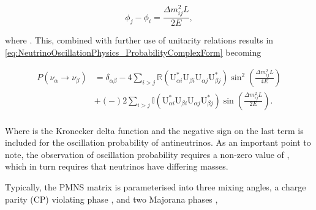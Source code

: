 \begin{equation}
  \phi_{j}-\phi_{i} = \frac{\Delta m^{2}_{ij} L}{2E},
\end{equation}

where . This, combined with further use of unitarity relations results in \autoref{eq:NeutrinoOscillationPhysics_ProbabilityComplexForm} becoming

\begin{equation}
  \label{eq:NeutrinoOscillationPhysics_ProbabilityComplexForm2}
  \begin{split}
    P(\nu_{\alpha} \rightarrow \nu_{\beta}) &= \delta_{\alpha \beta} - 4 \sum_{i>j} \mathbb{R} \left( \mathrm{U}^{*}_{\alpha i}\mathrm{U}_{\beta i}\mathrm{U}_{\alpha j}\mathrm{U}^{*}_{\beta j} \right) \sin^{2} \left( \frac{\Delta m^{2}_{ij} L}{4E} \right) \\
    & + \left( - \right) 2 \sum_{i>j} \mathbb{I} \left( \mathrm{U}^{*}_{\alpha i}\mathrm{U}_{\beta i}\mathrm{U}_{\alpha j}\mathrm{U}^{*}_{\beta j} \right) \sin \left( \frac{\Delta m^{2}_{ij} L}{2E} \right). \\
    \end{split}
\end{equation}

Where \quickmath{\delta_{\alpha \beta}} is the Kronecker delta function and the negative sign on the last term is included for the oscillation probability of antineutrinos. As an important point to note, the observation of oscillation probability requires a non-zero value of , which in turn requires that neutrinos have differing masses.

Typically, the PMNS matrix is parameterised into three mixing angles, a charge parity (CP) violating phase , and two Majorana phases ,

